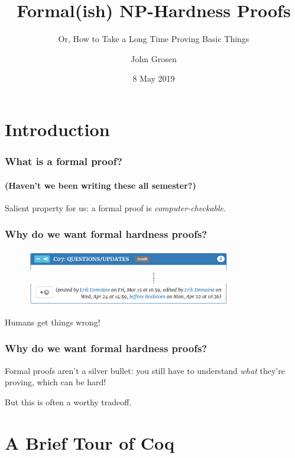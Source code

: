 \documentclass{beamer}
\title{Formal(ish) NP-Hardness Proofs}
\subtitle{Or, How to Take a Long Time Proving Basic Things}
\author{John Grosen}
\date{8 May 2019}
\begin{document}
\begin{frame}
  \titlepage
\end{frame}

\section{Introduction}

\begin{frame}
  \frametitle{What is a formal proof?}
  \framesubtitle{(Haven't we been writing these all semester?)}

  Salient property for us:
  \pause
  a formal proof is \emph{computer-checkable}.
\end{frame}

\begin{frame}
  \frametitle{Why do we want formal hardness proofs?}

  \vspace{-2ex}

  \begin{figure}
    \includegraphics[width=0.8\textwidth]{bug1header}
    $$\vdots$$
    $$\vdots$$
    \includegraphics[width=0.8\textwidth]{bug1footer}
  \end{figure}

  \pause
  \pause
  \centering
  Humans get things wrong!
\end{frame}

\begin{frame}
  \frametitle{Why do we want formal hardness proofs?}

  Formal proofs aren't a silver bullet: you still have to understand \emph{what}
  they're proving, which can be hard!

  \vspace{5ex}

  But this is often a worthy tradeoff.
\end{frame}

\section{A Brief Tour of Coq}
\end{document}
